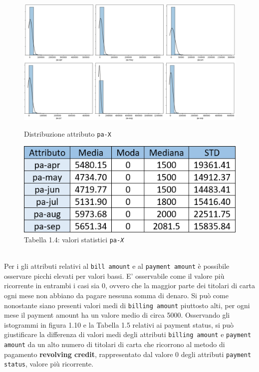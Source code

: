 \begin{figure}[!htb]
  \includegraphics[width=\linewidth]{img/pa-distribution.png}
  \caption{Distribuzione attributo \texttt{pa-X}}\label{pa-dist}
\endminipage\hfill
{}
  \includegraphics[width=\linewidth]{img/pa-stat.png}
\captionsetup{labelformat=empty}
\caption{Tabella 1.4: valori statistici \texttt{pa-\textit{X}}}
\label{pa-stat}
\endminipage\hfill
\end{figure}
\mbox{}\\
Per i gli attributi relativi al \texttt{bill amount} e al \texttt{payment amount} \`e possibile osservare picchi elevati per valori bassi. E' osservabile come il valore pi\`u ricorrente in entrambi i casi sia 0, ovvero che la maggior parte dei titolari di carta ogni mese non abbiano da pagare nessuna somma di denaro. Si pu\`o come nonostante siano presenti valori medi di \texttt{billing amount} piuttosto alti, per ogni mese il payment amount ha un valore medio di circa 5000. Osservando gli istogrammi in figura 1.10 e la Tabella 1.5 relativi ai payment status, si pu\`o giustificare la differenza di valori medi degli attributi \texttt{billing amount} e \texttt{payment amount} da un alto numero di titolari di carta che ricorrono al metodo di pagamento \textbf{revolving credit}, rappresentato dal valore 0 degli attributi \texttt{payment status}, valore pi\`u ricorrente.
